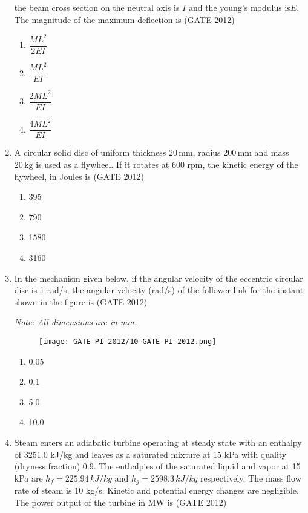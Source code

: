 \documentclass[journal,12pt,onecolumn]{IEEEtran}
\theoremstyle{remark}
\begin{document}
\begin{enumerate}
the beam cross section on the neutral axis is $I$ and the young's modulus is$ E$. The magnitude of 
the maximum deflection is 
\hfill{(GATE 2012)}
  \begin{enumerate}
    \item $\dfrac{ML^2}{2EI}$
    \item $\dfrac{ML^2}{EI}$
    \item $\dfrac{2ML^2}{EI}$
    \item $\dfrac{4ML^2}{EI}$
  \end{enumerate}
\vspace{1cm}
  \item A circular solid disc of uniform thickness $20 \,\text{mm}$, radius $200 \,\text{mm}$ and mass $20 \,\text{kg}$ is used as a flywheel. If it rotates at $600$ rpm, the kinetic energy of the flywheel, in Joules is
  \hfill{(GATE 2012)}
  \begin{enumerate}
    \item 395
    \item 790
    \item 1580
    \item 3160
  \end{enumerate}
\vspace{1cm}

\item  In the mechanism given below, if the angular velocity of the eccentric circular disc is 1 rad/s, the angular velocity (rad/s) of the follower link for the instant shown in the figure is
\hfill{(GATE 2012)}

\textit{Note: All dimensions are in mm.}

\begin{figure}[h!]
\centering
\texttt{[image: GATE-PI-2012/10-GATE-PI-2012.png]}
\caption{}
\label{q10}
\end{figure}

\begin{enumerate}
\item 0.05
\item 0.1
\item 5.0
\item 10.0
\end{enumerate}
\vspace{1cm}
\item Steam enters an adiabatic turbine operating at steady state with an enthalpy of 3251.0 kJ/kg and leaves as a saturated mixture at 15 kPa with quality (dryness fraction) 0.9. The enthalpies of the saturated liquid and vapor at 15 kPa are $h_f = 225.94 \, kJ/kg$ and $h_g = 2598.3 \, kJ/kg$ respectively. The mass flow rate of steam is 10 kg/s. Kinetic and potential energy changes are negligible. The power output of the turbine in MW is
\hfill{(GATE 2012)}


\end{enumerate}
\end{document}
